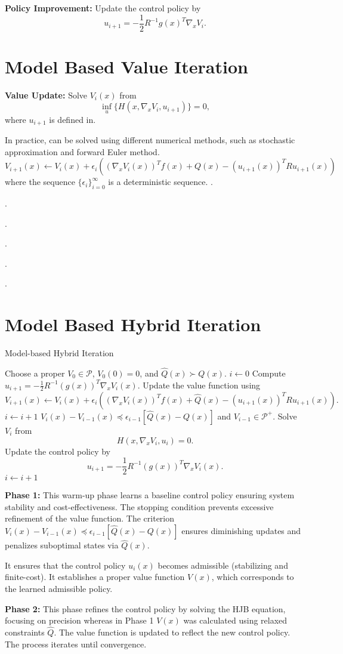 \documentclass[12pt]{article}
\begin{document}
\textbf{Policy Improvement:} Update the control policy by
\[
u_{i+1} = -\frac{1}{2} R^{-1} g(x)^T \nabla_x V_i.
\]

\section{Model Based Value Iteration}
\textbf{Value Update:} Solve \( V_i(x) \) from
\[
\inf_u \{ H(x, \nabla_x V_i, u_{i+1}) \} = 0,
\]
where \( u_{i+1} \) is defined in.

In practice, can be solved using different numerical methods, such as stochastic approximation and forward Euler method.
\[
V_{i+1}(x) \leftarrow V_i(x) + \epsilon_i \left( (\nabla_x V_i(x))^T f(x) + Q(x) - (u_{i+1}(x))^T R u_{i+1}(x) \right)
\]
where the sequence \(\{\epsilon_i\}_{i=0}^{\infty}\) is a deterministic sequence.
.

.

.

.

.

.
\section{Model Based Hybrid Iteration}

\begin{algorithm}
\caption{Model-based Hybrid Iteration}
\begin{algorithmic}[1]
\State Choose a proper $V_0 \in \mathcal{P}$, $V_0(0) = 0$, and $\hat{Q}(x) \succ Q(x)$.
\State $i \gets 0$
\Repeat
    \State Compute $u_{i+1} = -\frac{1}{2} R^{-1} (g(x))^T \nabla_x V_i(x)$.
    \State Update the value function using
    \[
    V_{i+1}(x) \gets V_i(x) + \epsilon_i \left( (\nabla_x V_i(x))^T f(x) + \hat{Q}(x) - (u_{i+1}(x))^T R u_{i+1}(x) \right).
    \]
    \State $i \gets i + 1$
\Until $V_i(x) - V_{i-1}(x) \preceq \epsilon_{i-1}[\hat{Q}(x) - Q(x)]$ and $V_{i-1} \in \mathcal{P}^+$.
\Loop
    \State Solve $V_i$ from
    \[
    H(x, \nabla_x V_i, u_i) = 0.
    \]
    \State Update the control policy by
    \[
    u_{i+1} = -\frac{1}{2} R^{-1} (g(x))^T \nabla_x V_i(x).
    \]
    \State $i \gets i + 1$
\EndLoop
\end{algorithmic}
\end{algorithm}

\textbf{Phase 1:} This warm-up phase learns a baseline control policy ensuring system stability and cost-effectiveness. The stopping condition prevents excessive refinement of the value function. The criterion \( V_i(x) - V_{i-1}(x) \preceq \epsilon_{i-1}[\hat{Q}(x) - Q(x)] \) ensures diminishing updates and penalizes suboptimal states via \( \hat{Q}(x) \).

It ensures that the control policy \( u_i(x) \) becomes admissible (stabilizing and finite-cost). It establishes a proper value function \( V(x) \), which corresponds to the learned admissible policy.

\textbf{Phase 2:} This phase refines the control policy by solving the HJB equation, focusing on precision whereas in Phase 1 \(V(x)\) was calculated using relaxed constraints \(\hat{Q}\). The value function is updated to reflect the new control policy. The process iterates until convergence.
\end{document}
